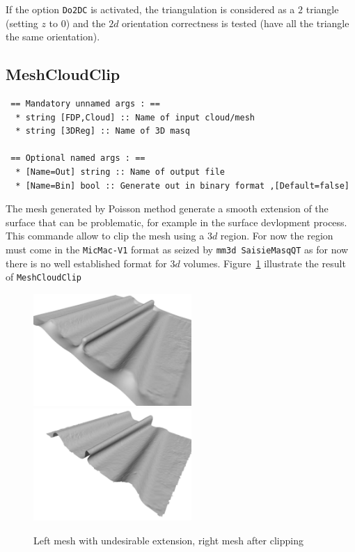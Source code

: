 If the option {\tt Do2DC} is activated, the triangulation is considered
as a $2$ triangle (setting $z$ to $0$) and  the $2d$ orientation correctness is
tested (have all the triangle the same orientation).


\subsection{MeshCloudClip}

\begin{verbatim}
 == Mandatory unnamed args : ==
  * string [FDP,Cloud] :: Name of input cloud/mesh
  * string [3DReg] :: Name of 3D masq

 == Optional named args : ==
  * [Name=Out] string :: Name of output file
  * [Name=Bin] bool :: Generate out in binary format ,[Default=false]
\end{verbatim}


The mesh generated by Poisson method generate a smooth extension of the surface
that can be problematic, for example in the surface devlopment process. This
commande allow to clip the mesh using a $3d$ region.  For now the region
must come in the {\tt MicMac-V1} format as seized by {\tt mm3d SaisieMasqQT}
as for now there is no well established format for $3d$ volumes.
Figure~\ref{fig:MeshClip} illustrate the result of {\tt MeshCloudClip}

\begin{figure}
\centering
\includegraphics[width=6cm]{CommandReferences/ImagesComRef/MeshWithSkirt.jpg}
\includegraphics[width=6cm]{CommandReferences/ImagesComRef/MeshCliped.jpg}
\caption{Left mesh with undesirable extension, right mesh after clipping}
\label{fig:MeshClip}
\end{figure}



